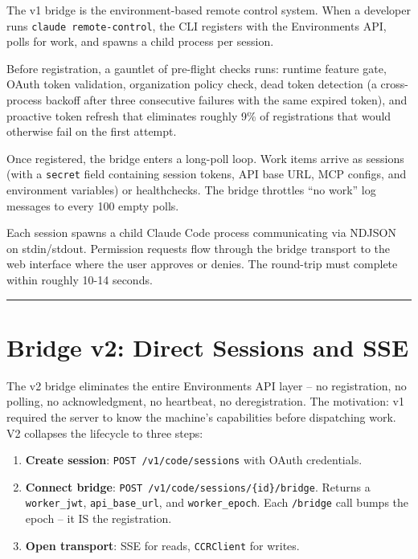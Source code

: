 \documentclass[
  english,
  11pt,
  letterpaper,
]{book}
\providecommand{\tightlist}{%
  \setlength{\itemsep}{0pt}\setlength{\parskip}{0pt}}
\begin{document}
The v1 bridge is the environment-based remote control system. When a
developer runs \texttt{claude\ remote-control}, the CLI registers with
the Environments API, polls for work, and spawns a child process per
session.

Before registration, a gauntlet of pre-flight checks runs: runtime
feature gate, OAuth token validation, organization policy check, dead
token detection (a cross-process backoff after three consecutive
failures with the same expired token), and proactive token refresh that
eliminates roughly 9\% of registrations that would otherwise fail on the
first attempt.

Once registered, the bridge enters a long-poll loop. Work items arrive
as sessions (with a \texttt{secret} field containing session tokens, API
base URL, MCP configs, and environment variables) or healthchecks. The
bridge throttles ``no work'' log messages to every 100 empty polls.

Each session spawns a child Claude Code process communicating via NDJSON
on stdin/stdout. Permission requests flow through the bridge transport
to the web interface where the user approves or denies. The round-trip
must complete within roughly 10-14 seconds.

\begin{center}\rule{0.5\linewidth}{0.5pt}\end{center}

\section{Bridge v2: Direct Sessions and
SSE}\label{bridge-v2-direct-sessions-and-sse}

The v2 bridge eliminates the entire Environments API layer -- no
registration, no polling, no acknowledgment, no heartbeat, no
deregistration. The motivation: v1 required the server to know the
machine's capabilities before dispatching work. V2 collapses the
lifecycle to three steps:

\begin{enumerate}
\def\labelenumi{\arabic{enumi}.}
\tightlist
\item
  \textbf{Create session}: \texttt{POST\ /v1/code/sessions} with OAuth
  credentials.
\item
  \textbf{Connect bridge}:
  \texttt{POST\ /v1/code/sessions/\{id\}/bridge}. Returns a
  \texttt{worker\_jwt}, \texttt{api\_base\_url}, and
  \texttt{worker\_epoch}. Each \texttt{/bridge} call bumps the epoch --
  it IS the registration.
\item
  \textbf{Open transport}: SSE for reads, \texttt{CCRClient} for writes.
\end{enumerate}
\end{document}
